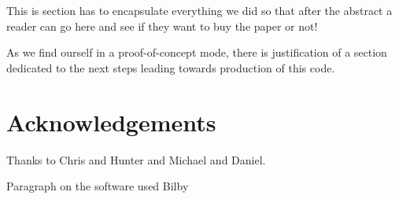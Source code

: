 \documentclass[aps,superscriptaddress,twocolumn,nopreprintnumbers,floatfix,groupedaddress]{revtex4-1}
\newcommand{\bilby}{{\sc Bilby}\xspace}
\begin{document}
This is section has to encapsulate everything we did so that after the abstract a reader can go here and see if they want to buy the paper or not!

As we find ourself in a proof-of-concept mode, there is justification of a section dedicated to the next steps leading towards production of this code.


\section*{Acknowledgements}

Thanks to Chris and Hunter and Michael and Daniel.

Paragraph on the software used \bilby\cite{bilby} 

\end{document}
